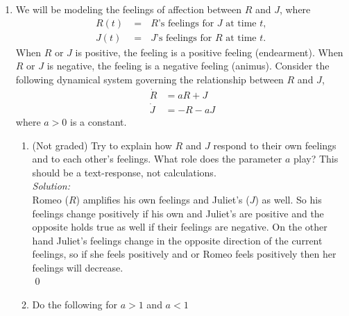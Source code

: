 \documentclass[10pt]{amsart}
\theoremstyle{nonumberplain}
\begin{document}
\begin{enumerate}[label={\bf {\arabic*}:}]
\begin{enumerate}
\end{enumerate}

\newpage

\item We will be modeling the feelings of affection between $R$ and $J$, where
\begin{align*}
R(t) &= \text{ $R$’s feelings for $J$ at time $t$, } \\
J(t) &= \text{ $J$’s feelings for $R$ at time $t$. }
\end{align*}
When $R$ or $J$ is positive, the feeling is a positive feeling (endearment).
When $R$ or $J$ is negative, the feeling is a negative feeling (animus).
Consider the following dynamical system governing the relationship between $R$ and $J$,
\begin{align*}
\dot R &= aR + J \\
\dot J &= -R -a J
\end{align*}
where $a > 0$ is a constant. \\

\begin{enumerate}

\item (Not graded) Try to explain how $R$ and $J$ respond to their own feelings and to each other’s feelings.
What role does the parameter $a$ play?
This should be a text-response, not calculations. \\
\textit{Solution:} \\
Romeo ($R$) amplifies his own feelings and Juliet's ($J$) as well.
So his feelings change positively if his own and Juliet's are positive and the opposite holds true as well if their feelings are negative.
On the other hand Juliet's feelings change in the opposite direction of the current feelings, so if she feels positively and or Romeo feels positively then her feelings will decrease.
\\
\qed

\item Do the following for $a > 1$ and $ a < 1$ \\

\begin{enumerate}


\end{enumerate}
\end{enumerate}
\end{enumerate}
\end{document}
